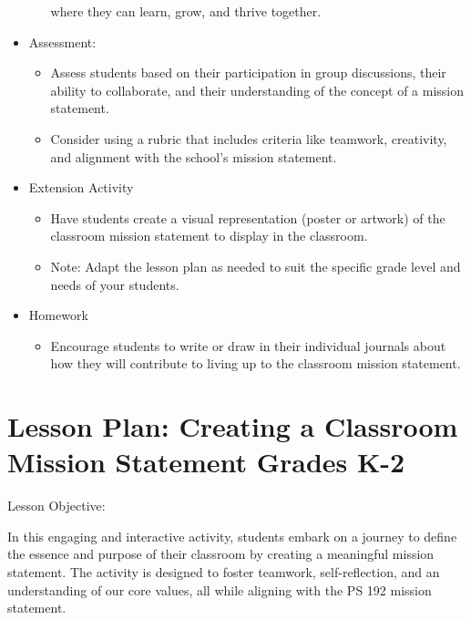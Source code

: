 \documentclass[14pt, letterpaper, twoside]{article}
\begin{document}
\begin{itemize}
\begin{itemize}
								where they can learn, grow, and thrive together.
				\end{itemize}
	\item Assessment:
				\begin{itemize}
					\item Assess students based on their participation in group discussions, their ability to collaborate, and their understanding of the concept of a mission statement.
					\item Consider using a rubric that includes criteria like teamwork, creativity, and alignment with the school's mission statement.
				\end{itemize}
	\item Extension Activity
				\begin{itemize}
					\item Have students create a visual representation (poster or artwork) of the classroom mission statement to display in the classroom.
					\item Note: Adapt the lesson plan as needed to suit the specific grade level and needs of your students.
				\end{itemize}
	\item Homework
				\begin{itemize}
					\item Encourage students to write or draw in their individual journals about how they will contribute to living up to the classroom mission statement.
				\end{itemize}
\end{itemize}
\newpage

\section{Lesson Plan: Creating a Classroom Mission Statement Grades K-2}
Lesson Objective:

In this engaging and interactive activity, students embark on a journey to define the essence and purpose of
their classroom by creating a meaningful mission statement. The activity is designed to foster teamwork,
self-reflection, and an understanding of our core values, all while aligning with the PS 192 mission statement.
\end{document}
